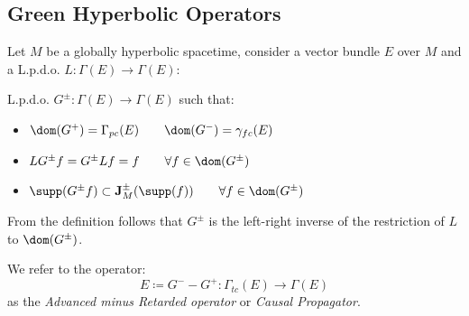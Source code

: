 \documentclass[Main]{subfiles}
\begin{document}
		\subsection{Green Hyperbolic Operators}	
			Let $M$ be a globally hyperbolic spacetime, consider a vector bundle $E$ over $M$ and a L.p.d.o. $L: \Gamma(E) \rightarrow \Gamma(E)$:
			\begin{definition}
				L.p.d.o. $G^\pm : \Gamma (E) \rightarrow \Gamma(E)$ such that:
				\begin{itemize}
					\item $\dom(G^+) = \Gamma_{pc}(E) \qquad \dom(G^-) = \gamma_{fc}(E)$
					\item $LG^\pm f=G^\pm Lf = f \qquad \forall f\in \dom(G^\pm)$
					\item $\supp(G^\pm f) \subset \mathbf{J}^\pm_M (\supp(f)) \qquad \forall f\in \dom(G^\pm)$
				\end{itemize}
			\end{definition}
			\begin{observation}
				From the definition follows that $G^\pm$ is the left-right inverse of the restriction of $L$ to $\dom(G^\pm)$.
			\end{observation}
			\begin{notationfix}
				We refer to the operator:
				\begin{displaymath}
					E \coloneqq G^-  - G^+ : \Gamma_{tc}(E) \rightarrow \Gamma(E)
				\end{displaymath}
				as the \emph{Advanced minus Retarded operator} or \emph{Causal Propagator}\cite{Benini2013}.
			\end{notationfix}		
		
\end{document}
